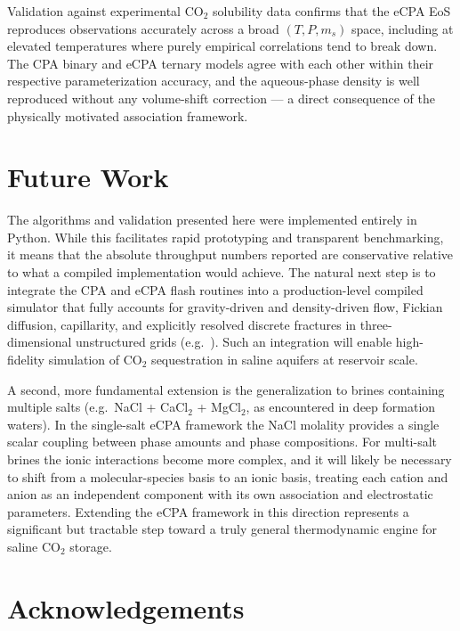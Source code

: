 \documentclass[preprint,12pt,authoryear]{elsarticle}
\begin{document}
Validation against experimental CO$_2$ solubility data confirms that the eCPA EoS
reproduces observations accurately across a broad $(T, P, m_s)$ space, including at
elevated temperatures where purely empirical correlations tend to break down.
The CPA binary and eCPA ternary models agree with each other within their respective
parameterization accuracy, and the aqueous-phase density is well reproduced without any
volume-shift correction — a direct consequence of the physically motivated association
framework.

\section*{Future Work}
\label{sec:future}

The algorithms and validation presented here were implemented entirely in Python.
While this facilitates rapid prototyping and transparent benchmarking, it means that
the absolute throughput numbers reported are conservative relative to what a compiled
implementation would achieve.
The natural next step is to integrate the CPA and eCPA flash routines into a
production-level compiled simulator that fully accounts for gravity-driven and
density-driven flow, Fickian diffusion, capillarity, and explicitly resolved discrete
fractures in three-dimensional unstructured grids (e.g.\
\citealt{moortgat2011compositional, moortgat2011three, moortgat2013higher,
moortgat2016mixed, moortgat2018reservoir, solovsky2025efficient, solovsky2026efficient}).
Such an integration will enable high-fidelity simulation of CO$_2$ sequestration
in saline aquifers at reservoir scale.

A second, more fundamental extension is the generalization to brines containing
multiple salts (e.g.\ NaCl + CaCl$_2$ + MgCl$_2$, as encountered in deep formation
waters).
In the single-salt eCPA framework the NaCl molality provides a single scalar
coupling between phase amounts and phase compositions.
For multi-salt brines the ionic interactions become more complex, and it will likely
be necessary to shift from a molecular-species basis to an ionic basis, treating each
cation and anion as an independent component with its own association and electrostatic
parameters.
Extending the eCPA framework in this direction represents a significant but tractable
step toward a truly general thermodynamic engine for saline CO$_2$ storage.


\section*{Acknowledgements}
\end{document}
